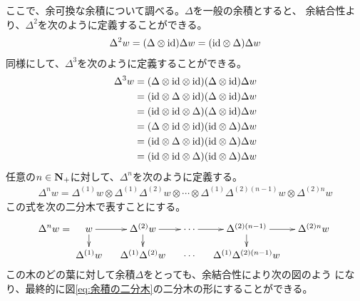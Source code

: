 	ここで、余可換な余積について調べる。$\Delta$を一般の余積とすると、
	余結合性より、$\Delta^2$を次のように定義することができる。
	\begin{equation*}\begin{split} %
		\Delta^2w=(\Delta\otimes\myid)\Delta w=(\myid\otimes\Delta)\Delta w
	\end{split}\end{equation*} %
	同様にして、$\Delta^3$を次のように定義することができる。
	\begin{equation*}\begin{split} %
		\Delta^3w
		&=(\Delta\otimes\myid\otimes\myid)(\Delta\otimes\myid)\Delta w \\
		&=(\myid\otimes\Delta\otimes\myid)(\Delta\otimes\myid)\Delta w \\
		&=(\myid\otimes\myid\otimes\Delta)(\Delta\otimes\myid)\Delta w \\
		&=(\Delta\otimes\myid\otimes\myid)(\myid\otimes\Delta)\Delta w \\
		&=(\myid\otimes\Delta\otimes\myid)(\myid\otimes\Delta)\Delta w \\
		&=(\myid\otimes\myid\otimes\Delta)(\myid\otimes\Delta)\Delta w \\
	\end{split}\end{equation*} %
	任意の$n\in{\mathbf{N}}_+$に対して、$\Delta^n$を次のように定義する。
	\begin{equation*}\begin{split} %
		\Delta^nw = \Delta^{(1)}w\otimes \Delta^{(1)}\Delta^{(2)}w\otimes 
		\cdots\otimes \Delta^{(1)}\Delta^{(2)(n-1)}w\otimes \Delta^{(2)n}w
	\end{split}\end{equation*} %
	この式を次の二分木で表すことにする。
	\begin{equation}\label{eq:余積の二分木}
		\Delta^nw = \xymatrix@R=1pc@C=1pc{
			w \ar[r]\ar[d] & \Delta^{(2)}w \ar[r]\ar[d] 
			& \cdots \ar[r] & \Delta^{(2)(n-1)} \ar[r]\ar[d] & \Delta^{(2)n}w \\
			\Delta^{(1)}w & \Delta^{(1)}\Delta^{(2)}w 
			& \cdots & \Delta^{(1)}\Delta^{(2)(n-1)}w \\
		}
	\end{equation}
	この木のどの葉に対して余積$\Delta$をとっても、余結合性により次の図のよう
	になり、最終的に図\eqref{eq:余積の二分木}の二分木の形にすることができる。
